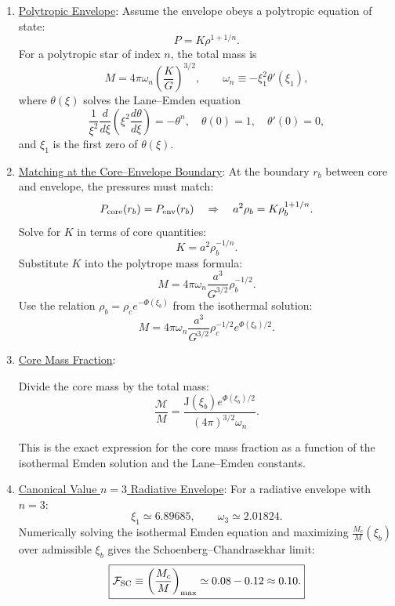 \documentclass[12pt,a4paper]{article}
\numberwithin{equation}{section}
\begin{document}
\begin{enumerate}
\item\underline{Polytropic Envelope}:
Assume the envelope obeys a polytropic equation of state:
\begin{equation}
P = K \rho^{1 + 1/n}.
\end{equation}
For a polytropic star of index $n$, the total mass is
\begin{equation}
M = 4 \pi \omega_n \left( \frac{K}{G} \right)^{3/2},
\qquad
\omega_n \equiv -\xi_1^2 \theta'(\xi_1),
\end{equation}
where $\theta(\xi)$ solves the Lane--Emden equation
\begin{equation}
\frac{1}{\xi^2} \frac{d}{d\xi} \left( \xi^2 \frac{d\theta}{d\xi} \right) = -\theta^n,
\quad
\theta(0)=1, \quad \theta'(0)=0,
\end{equation}
and $\xi_1$ is the first zero of $\theta(\xi)$.

\item\underline{Matching at the Core--Envelope Boundary}:
At the boundary $r_b$ between core and envelope, the pressures must match:
\begin{equation}
P_{\rm core}(r_b) = P_{\rm env}(r_b)
\quad \Rightarrow \quad
a^2 \rho_b = K \rho_b^{1 + 1/n}.
\end{equation}
Solve for $K$ in terms of core quantities:
\begin{equation}
K = a^2 \rho_b^{-1/n}.
\end{equation}
Substitute $K$ into the polytrope mass formula:
\begin{equation}
M = 4 \pi \omega_n \frac{a^3}{G^{3/2}} \rho_b^{-1/2}.
\end{equation}
Use the relation $\rho_b = \rho_c e^{-\Phi(\xi_b)}$ from the isothermal solution:
\begin{equation}
\boxed{
M = 4 \pi \omega_n \frac{a^3}{G^{3/2}} \rho_c^{-1/2} e^{\Phi(\xi_b)/2}.
}
\end{equation}

\item\underline{Core Mass Fraction}:

Divide the core mass by the total mass:
\begin{equation}
\frac{\mathcal{M}}{M} = \frac{\mathrm{J}(\xi_b) e^{\Phi(\xi_b)/2}}{(4 \pi)^{3/2} \omega_n}.
\end{equation}

This is the exact expression for the core mass fraction as a function of the isothermal Emden solution and the Lane--Emden constants.

\item\underline{Canonical Value $n=3$ Radiative Envelope}:
For a radiative envelope with $n=3$:
\begin{equation}
\xi_1 \simeq 6.89685, \qquad \omega_3 \simeq 2.01824.
\end{equation}
Numerically solving the isothermal Emden equation and maximizing
$\frac{M_c}{M}(\xi_b)$ over admissible $\xi_b$ gives the Schoenberg--Chandrasekhar limit:
\begin{equation}
\boxed{
\mathcal{F}_{\rm SC} \equiv \left( \frac{M_c}{M} \right)_{\rm max} \simeq 0.08 - 0.12 \approx 0.10.
}
\end{equation}
\end{enumerate}
\end{document}
